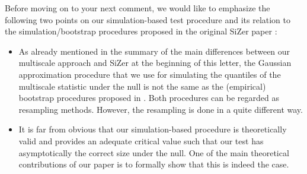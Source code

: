\documentclass[a4paper,12pt]{article}
\begin{document}
\begin{enumerate}[label=(\arabic*),leftmargin=0.7cm]
%
%

Before moving on to your next comment, we would like to emphasize the following two points on our simulation-based test procedure and its relation to the simulation/bootstrap procedures proposed in the original SiZer paper \citep{ChaudhuriMarron1999}: 
\begin{itemize}[leftmargin=0.5cm]
\item As already mentioned in the summary of the main differences between our multiscale approach and SiZer at the beginning of this letter, the Gaussian approximation procedure that we use for simulating the quantiles of the multiscale statistic under the null is not the same as the (empirical) bootstrap procedures proposed in \cite{ChaudhuriMarron1999, ChaudhuriMarron2000}. Both procedures can be regarded as resampling methods. However, the resampling is done in a quite different way. 
\item It is far from obvious that our simulation-based procedure is theoretically valid and provides an adequate critical value such that our test has asymptotically the correct size under the null. One of the main theoretical contributions of our paper is to formally show that this is indeed the case. 
\end{itemize}



\end{enumerate}
\end{document}
